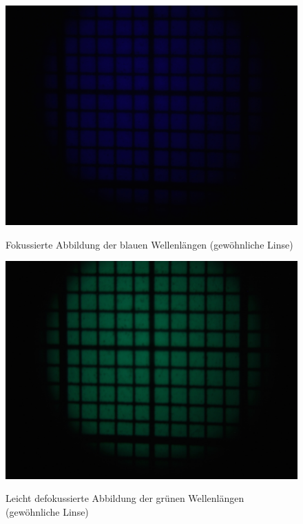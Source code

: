 \begin{figure}[htb]
	\begin{minipage}[t]{0.32\textwidth}
		\includegraphics[clip=true, trim=700px 950px 900px 250px, width=\linewidth]{img/ChromAbb/Prakt_Linsenfehler_2015_06_04_068}
		\label{fig:cm_blau}
		\caption{Fokussierte Abbildung der blauen Wellenlängen (gewöhnliche Linse)}
	\end{minipage}
	\hfill
	\begin{minipage}[t]{0.32\textwidth}
		\includegraphics[clip=true, trim=707px 950px 907px 250px, width=\linewidth]{img/ChromAbb/Prakt_Linsenfehler_2015_06_04_069}
		\label{fig:cm_gruen}
		\caption{Leicht defokussierte Abbildung der grünen Wellenlängen (gewöhnliche Linse)}
	\end{minipage}

\end{figure}
